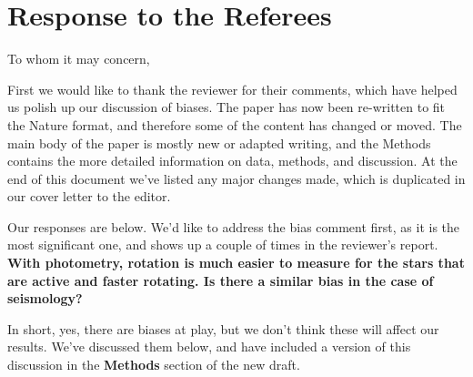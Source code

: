 \documentclass[11pt]{article}
\begin{document}
	
\section*{Response to the Referees}

To whom it may concern,

First we would like to thank the reviewer for their comments, which have helped us polish up our discussion of biases. The paper has now been re-written to fit the Nature format, and therefore some of the content has changed or moved. The main body of the paper is mostly new or adapted writing, and the Methods contains the more detailed information on data, methods, and discussion. At the end of this document we’ve listed any major changes made, which is duplicated in our cover letter to the editor.

Our responses are below. We’d like to address the bias comment first, as it is the most significant one, and shows up a couple of times in the reviewer’s report. \\

\noindent \textbf{With photometry, rotation is much easier to measure for the stars that are active and faster rotating. Is there a similar bias in the case of seismology? }

In short, yes, there are biases at play, but we don’t think these will affect our results. We’ve discussed them below, and have included a version of this discussion in the \textbf{Methods} section of the new draft.
\end{document}
